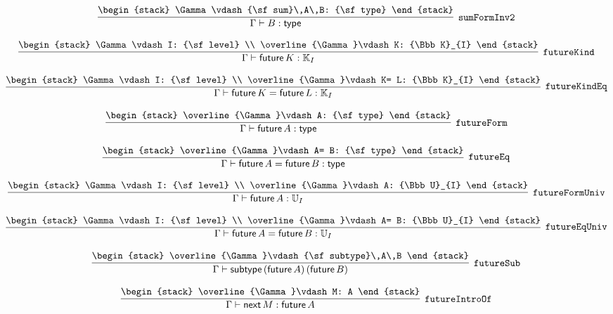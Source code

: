\[
\infer[{\tt sumFormInv2}]{\Gamma \vdash B: {\sf type}}{
\begin{stack}
\Gamma \vdash {\sf sum}\,A\,B: {\sf type}
\end{stack}}
\]

\[
\infer[{\tt futureKind}]{\Gamma \vdash {\sf future}\,K: {\Bbb K}_{I}}{
\begin{stack}
\Gamma \vdash I: {\sf level}
\\
\overline{\Gamma}\vdash K: {\Bbb K}_{I}
\end{stack}}
\]

\[
\infer[{\tt futureKindEq}]{\Gamma \vdash {\sf future}\,K= {\sf future}\,L: {\Bbb K}_{I}}{
\begin{stack}
\Gamma \vdash I: {\sf level}
\\
\overline{\Gamma}\vdash K= L: {\Bbb K}_{I}
\end{stack}}
\]

\[
\infer[{\tt futureForm}]{\Gamma \vdash {\sf future}\,A: {\sf type}}{
\begin{stack}
\overline{\Gamma}\vdash A: {\sf type}
\end{stack}}
\]

\[
\infer[{\tt futureEq}]{\Gamma \vdash {\sf future}\,A= {\sf future}\,B: {\sf type}}{
\begin{stack}
\overline{\Gamma}\vdash A= B: {\sf type}
\end{stack}}
\]

\[
\infer[{\tt futureFormUniv}]{\Gamma \vdash {\sf future}\,A: {\Bbb U}_{I}}{
\begin{stack}
\Gamma \vdash I: {\sf level}
\\
\overline{\Gamma}\vdash A: {\Bbb U}_{I}
\end{stack}}
\]

\[
\infer[{\tt futureEqUniv}]{\Gamma \vdash {\sf future}\,A= {\sf future}\,B: {\Bbb U}_{I}}{
\begin{stack}
\Gamma \vdash I: {\sf level}
\\
\overline{\Gamma}\vdash A= B: {\Bbb U}_{I}
\end{stack}}
\]

\[
\infer[{\tt futureSub}]{\Gamma \vdash {\sf subtype}\,({\sf future}\,A)\,({\sf future}\,B)}{
\begin{stack}
\overline{\Gamma}\vdash {\sf subtype}\,A\,B
\end{stack}}
\]

\[
\infer[{\tt futureIntroOf}]{\Gamma \vdash {\sf next}\,M: {\sf future}\,A}{
\begin{stack}
\overline{\Gamma}\vdash M: A
\end{stack}}
\]

